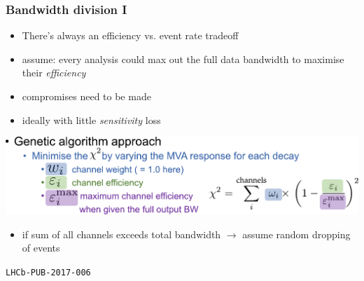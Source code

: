 \documentclass[table,xcolor=dvipsnames,professionalfonts]{beamer}
\begin{document}
\begin{frame}
  \frametitle{Bandwidth division I}
  \begin{itemize}
    \item There's always an efficiency vs. event rate tradeoff
    \item assume: every analysis could max out the full data bandwidth to maximise their \emph{efficiency}
    \item compromises need to be made
    \item ideally with little \emph{sensitivity} loss
  \end{itemize}

  \begin{block}{}
    \includegraphics[width=\textwidth]{./BW.pdf}
    \begin{itemize}
        \item if sum of all channels exceeds total bandwidth \newline$\rightarrow$ assume random dropping of events
    \end{itemize}
  \end{block}


{\footnotesize{\texttt{LHCb-PUB-2017-006}}}
\end{frame}
\end{document}
